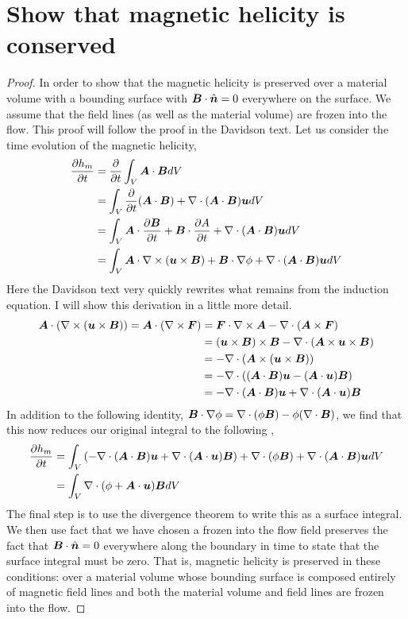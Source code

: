 \documentclass{article}
\begin{document}
\section{Show that magnetic helicity is conserved}
\begin{proof}
    In order to show that the magnetic helicity is preserved over a material
    volume with a bounding surface with $\boldsymbol{B}\cdot\hat{\boldsymbol{n}} = 0$ everywhere on the
    surface. We assume that the field lines (as well as the material volume) are
    frozen into the flow. This proof will follow the proof in the Davidson text. 
    Let us consider the time evolution of the magnetic helicity,
    \begin{align*}
        \frac{\partial h_m}{\partial t} &= \frac{\partial }{\partial t}\int_V \boldsymbol{A}\cdot\boldsymbol{B} dV\\
        &= \int_V \frac{\partial }{\partial t}(\boldsymbol{A}\cdot\boldsymbol{B}) + \nabla\cdot(\boldsymbol{A}\cdot\boldsymbol{B})\boldsymbol{u} dV\\
        &= \int_V \boldsymbol{A}\cdot\frac{\partial \boldsymbol{B}}{\partial t} + \boldsymbol{B}\cdot\frac{\partial A}{\partial t} + \nabla\cdot(\boldsymbol{A}\cdot\boldsymbol{B})\boldsymbol{u}
        dV\\
        &= \int_V \boldsymbol{A}\cdot\nabla\times(\boldsymbol{u}\times\boldsymbol{B}) + \boldsymbol{B}\cdot\nabla\phi +
        \nabla\cdot(\boldsymbol{A}\cdot\boldsymbol{B})\boldsymbol{u} dV
    \end{align*}
    Here the Davidson text very quickly rewrites what remains from the induction
    equation. I will show this derivation in a little more detail. 
    \begin{align*}
        \boldsymbol{A}\cdot(\nabla\times(\boldsymbol{u}\times\boldsymbol{B})) =  \boldsymbol{A}\cdot(\nabla\times\boldsymbol{F}) &=
        \boldsymbol{F}\cdot\nabla\times\boldsymbol{A} - \nabla\cdot(\boldsymbol{A}\times\boldsymbol{F}) \\
        &= (\boldsymbol{u}\times\boldsymbol{B})\times\boldsymbol{B} - \nabla\cdot(\boldsymbol{A}\times\boldsymbol{u}\times\boldsymbol{B})\\
        &=  -\nabla\cdot(\boldsymbol{A}\times(\boldsymbol{u}\times\boldsymbol{B}))\\
        &=  -\nabla\cdot((\boldsymbol{A}\cdot\boldsymbol{B})\boldsymbol{u} - (\boldsymbol{A}\cdot\boldsymbol{u})\boldsymbol{B})\\
        &= -\nabla \cdot (\boldsymbol{A}\cdot\boldsymbol{B})\boldsymbol{u} + \nabla\cdot(\boldsymbol{A}\cdot\boldsymbol{u})\boldsymbol{B}
    \end{align*}
    In addition to the following identity, $\boldsymbol{B}\cdot\nabla\phi =
    \nabla\cdot(\phi\boldsymbol{B}) - \phi(\nabla \cdot{\boldsymbol{B}})$, 
    we find that this now reduces our original integral to the following , 
    \begin{align*}
        \frac{\partial h_m}{\partial t} &= \int_V \left(-\nabla \cdot (\boldsymbol{A}\cdot\boldsymbol{B})\boldsymbol{u} +
        \nabla\cdot(\boldsymbol{A}\cdot\boldsymbol{u})\boldsymbol{B}\right)
        + \nabla\cdot(\phi\boldsymbol{B}) +
        \nabla\cdot(\boldsymbol{A}\cdot\boldsymbol{B})\boldsymbol{u} dV\\
        &= \int_V \nabla\cdot(\phi + \boldsymbol{A}\cdot\boldsymbol{u})\boldsymbol{B} dV
    \end{align*}
    The final step is to use the divergence theorem to write this as a surface
    integral. We then use fact that we have chosen a frozen into the flow
    field preserves the fact that $\boldsymbol{B}\cdot\hat{\boldsymbol{n}} = 0$ everywhere along the
    boundary in time to state that the surface integral must be zero. That is,
    magnetic helicity is preserved in these conditions: over a material volume
    whose bounding surface is composed entirely of magnetic field lines and both
    the material volume and field lines are frozen into the flow. 
\end{proof}
\end{document}
